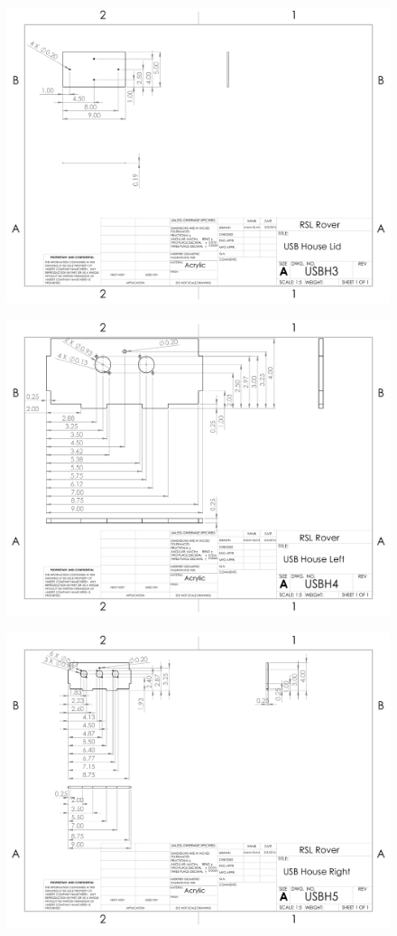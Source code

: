 \begin{figure}[H]
	\centerline{\includegraphics[angle=90,width=1.0\linewidth]{dwgs/USBH3.pdf}}
\end{figure}

\begin{figure}[H]
	\centerline{\includegraphics[angle=90,width=1.0\linewidth]{dwgs/USBH4.pdf}}
\end{figure}

\begin{figure}[H]
	\centerline{\includegraphics[angle=90,width=1.0\linewidth]{dwgs/USBH5.pdf}}
\end{figure}
